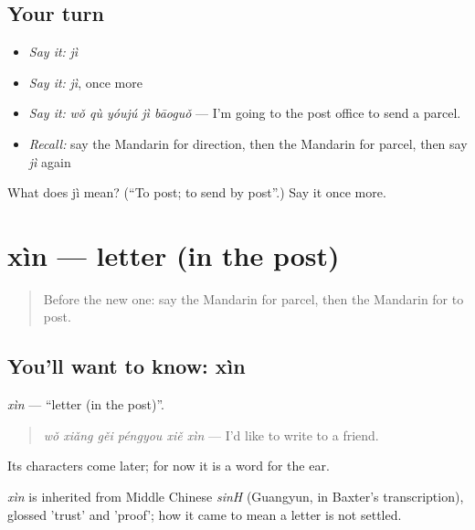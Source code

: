 \subsection*{Your turn}
\begin{itemize}
\raggedright
  \item \emph{Say it:} \emph{jì}
  \item \emph{Say it:} \emph{jì}, once more
  \item \emph{Say it:} \emph{wǒ qù yóujú jì bāoguǒ} — I'm going to the post office to send a parcel.
  \item \emph{Recall:} say the Mandarin for direction, then the Mandarin for parcel, then say \emph{jì} again
\end{itemize}

\begin{tcolorbox}[breakable,colback=teal!4,colframe=teal!35!black,title={Before you move on}]
What does jì mean? (\textquotedblleft{}To post; to send by post\textquotedblright{}.) Say it once more.
\end{tcolorbox}
\section[xìn]{xìn — letter (in the post)}

\label{lesson:ZH-C118-xin}



\begin{quote}
Before the new one: say the Mandarin for parcel, then the Mandarin for to post.
\end{quote}

\subsection*{You'll want to know: xìn}
\emph{xìn} — \textquotedblleft{}letter (in the post)\textquotedblright{}.

\begin{quote}
\emph{wǒ xiǎng gěi péngyou xiě xìn} — I'd like to write to a friend.
\end{quote}

Its characters come later; for now it is a word for the ear.

\begin{cousinweb}
\emph{xìn} is inherited from Middle Chinese \emph{sinH} (Guangyun, in Baxter's transcription), glossed 'trust' and 'proof'; how it came to mean a letter is not settled.
\end{cousinweb}


